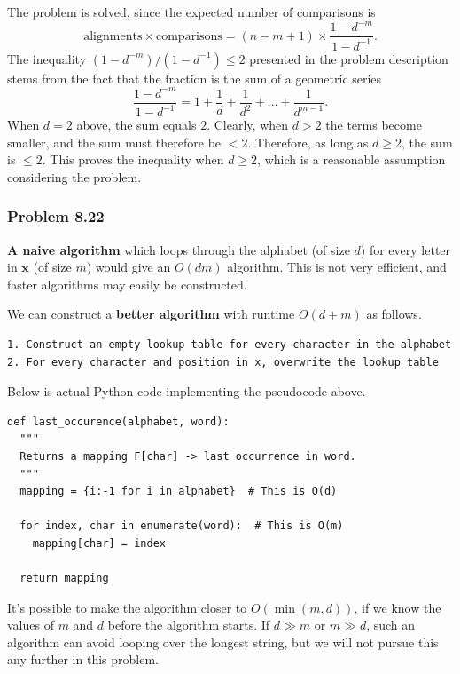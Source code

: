 \documentclass[12pt, a4paper]{article}
\newcommand{\vect}[1]{\bm{#1}}
\begin{document}
{\begin{equation*}
\end{equation*}
The problem is solved, since the expected number of comparisons is 
\begin{equation*}
	\text{alignments} \times \text{comparisons} = (n - m + 1) \times \frac{1 - d^{-m}}{1 - d^{-1}} .
\end{equation*}
The inequality $(1 - d^{-m})/(1 - d^{-1}) \leq 2$ presented in the problem description stems from the fact that the fraction is the sum of a geometric series
\begin{equation*}
	\frac{1 - d^{-m}}{1 - d^{-1}} = 1 + \frac{1}{d} + \frac{1}{d^2}  + \dots + \frac{1}{d^{m-1}}.
\end{equation*}
When $d=2$ above, the sum equals $2$. 
Clearly, when $d > 2$ the terms become smaller, and the sum must therefore be $< 2$.
Therefore, as long as $d \geq 2$, the sum is $\leq 2$.
This proves the inequality when $d \geq 2$, which is a reasonable assumption considering the problem.


\subsubsection*{Problem 8.22}
\textbf{A naive algorithm} which loops through the alphabet (of size $d$) for every letter in $\vect{x}$ (of size $m$) would give an $O(dm)$ algorithm.
This is not very efficient, and faster algorithms may easily be constructed.

We can construct a \textbf{better algorithm} with runtime $O(d + m)$ as follows.
\begin{verbatim}
1. Construct an empty lookup table for every character in the alphabet
2. For every character and position in x, overwrite the lookup table
\end{verbatim}
Below is actual Python code implementing the pseudocode above.
\begin{Verbatim}
def last_occurence(alphabet, word):
  """
  Returns a mapping F[char] -> last occurrence in word.
  """
  mapping = {i:-1 for i in alphabet}  # This is O(d)

  for index, char in enumerate(word):  # This is O(m)
    mapping[char] = index

  return mapping
\end{Verbatim}
It's possible to make the algorithm closer to $O(\min(m, d))$, if we know the values of $m$ and $d$ before the algorithm starts.
If $d\gg m$ or $m \gg d$, such an algorithm can avoid looping over the longest string, but we will not pursue this any further in this problem.

}
\end{document}
